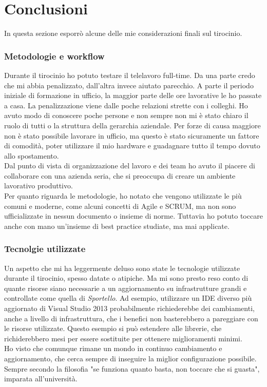 \section{Conclusioni}

In questa sezione esporrò alcune delle mie considerazioni finali sul tirocinio.

\subsubsection{Metodologie e workflow}
Durante il tirocinio ho potuto testare il telelavoro full-time. Da una parte credo che mi abbia penalizzato, dall'altra invece aiutato parecchio. A parte il periodo iniziale di formazione in ufficio, la maggior parte delle ore lavorative le ho passate a casa. La penalizzazione viene dalle poche relazioni strette con i colleghi. Ho avuto modo di conoscere poche persone e non sempre non mi è stato chiaro il ruolo di tutti o la struttura della gerarchia aziendale. Per forze di causa maggiore non è stato possibile lavorare in ufficio, ma questo è stato sicuramente un fattore di comodità, poter utilizzare il mio hardware e guadagnare tutto il tempo dovuto allo spostamento. \\
Dal punto di vista di organizzazione del lavoro e dei team ho avuto il piacere di collaborare con una azienda seria, che si preoccupa di creare un ambiente lavorativo produttivo. \\
Per quanto riguarda le metodologie, ho notato che vengono utilizzate le più comuni e moderne, come alcuni concetti di Agile e SCRUM, ma non sono ufficializzate in nessun documento o insieme di norme. 
Tuttavia ho potuto toccare anche con mano un'insieme di best practice studiate, ma mai applicate. 

\subsubsection{Tecnolgie utilizzate}
Un aspetto che mi ha leggermente deluso sono state le tecnologie utilizzate durante il tirocinio, spesso datate o atipiche. Ma mi sono presto reso conto di quante risorse siano necessarie a un aggiornamento su infrastrutture grandi e controllate come quella di \textit{Sportello}. Ad esempio, utilizzare un IDE diverso più aggiornato di Visual Studio 2013 probabilmente richiederebbe dei cambiamenti, anche a livello di infrastruttura, che i benefici non basterebbero a pareggiare con le risorse utilizzate. Questo esempio si può estendere alle librerie, che richiderebbero mesi per essere sostituite per ottenere miglioramenti minimi. \\ Ho visto che comunque rimane un mondo in continuo cambiamento e aggiornamento, che cerca sempre di inseguire la miglior configurazione possibile. Sempre secondo la filosofia "se funziona quanto basta, non toccare che si guasta", imparata all'università.